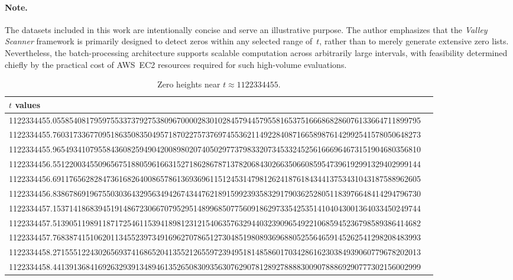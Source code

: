 \documentclass[11pt,a4paper]{article}
\begin{document}
\paragraph{Note.}
The datasets included in this work are intentionally concise and serve an illustrative purpose.  
The author emphasizes that the \textit{Valley Scanner} framework is primarily designed to detect zeros within any selected range of~$t$, rather than to merely generate extensive zero lists.  
Nevertheless, the batch-processing architecture supports scalable computation across arbitrarily large intervals, 
with feasibility determined chiefly by the practical cost of AWS~EC2 resources required for such high-volume evaluations.

\begin{table}[H]
\centering
\small
\begin{adjustbox}{max width=\textwidth}
\caption{Zero heights near $t \approx 1122334455$.}
\begin{tabular}{ll}
\hline
\textbf{$t$ values} \\
\hline
1122334455.05585408179597553373792753809670000283010284579445795581653751666868286076133664711899795 \\
1122334455.76031733677095186350835049571870227573769745536211492284087166589876142992541578050648273 \\
1122334455.96549341079558436082594904200898020740502977379833207345332452561666964673151904680356810 \\
1122334456.55122003455096567518805961663152718628678713782068430266350660859547396192991329402999144 \\
1122334456.69117656282847361682640086578613693696115124531479812624187618434413753431043187588962605 \\
1122334456.83867869196755030364329563494267434476218915992393583291790362528051183976648414294796730 \\
1122334457.15371418683945191486723066707952951489968507756091862973354253514104043001364033450249744 \\
1122334457.51390511989118717254611539418981231215406357632944032390965492210685945236798589386414682 \\
1122334457.76838741510620113455239734916962707865127304851980893696880525564659145262541298208483993 \\
1122334458.27155512243026569374168652041355212655972394951814858601703428616230384939060779678202013 \\
1122334458.44139136841692632939134894613526508309356307629078128927888830090788869290777302156002999 \\

\end{tabular}
\end{adjustbox}
\end{table}
\end{document}

